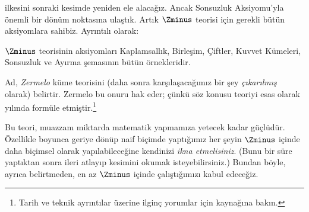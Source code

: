 \documentclass[../../../include/open-logic-section]{subfiles}
\begin{document}

\stagesinf{} ilkesini sonraki kesimde yeniden ele alacağız. Ancak Sonsuzluk
Aksiyomu'yla önemli bir dönüm noktasına ulaştık. Artık $\Zminus$ teorisi
için gerekli bütün aksiyomlara sahibiz. Ayrıntılı olarak:

\begin{defn}
$\Zminus$ teorisinin aksiyomları Kaplamsallık, Birleşim, Çiftler, Kuvvet
Kümeleri, Sonsuzluk ve Ayırma şemasının bütün örnekleridir.
\end{defn}

Ad, \emph{Zermelo} küme teorisini (daha sonra karşılaşacağımız bir şey
\emph{çıkarılmış} olarak) belirtir. Zermelo bu onuru hak eder; çünkü söz
konusu teoriyi esas olarak \citeyear{Zermelo1908Untersuchungen} yılında
formüle etmiştir.\footnote{Tarih ve teknik ayrıntılar üzerine ilginç
yorumlar için \citet[Ek A]{Potter2004} kaynağına bakın.}

Bu teori, muazzam miktarda matematik yapmamıza yetecek kadar güçlüdür.
Özellikle  boyunca geriye dönüp naif biçimde
yaptığımız her şeyin $\Zminus$ içinde daha biçimsel olarak yapılabileceğine
kendinizi \emph{ikna etmelisiniz}. (Bunu bir süre yaptıktan sonra ileri
atlayıp  kesimini okumak
isteyebilirsiniz.) Bundan böyle, ayrıca belirtmeden, en az $\Zminus$
içinde çalıştığımızı kabul edeceğiz.
\end{document}

